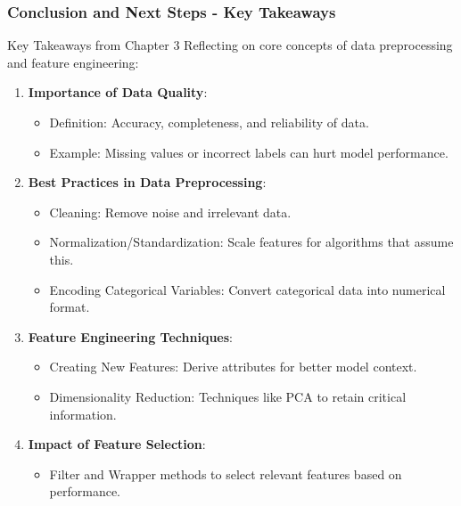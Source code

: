 \documentclass[aspectratio=169]{beamer}
\begin{document}
\begin{frame}[fragile]
  \frametitle{Conclusion and Next Steps - Key Takeaways}
  
  \begin{block}{Key Takeaways from Chapter 3}
    Reflecting on core concepts of data preprocessing and feature engineering:
  \end{block}
  
  \begin{enumerate}
    \item \textbf{Importance of Data Quality}:
    \begin{itemize}
      \item Definition: Accuracy, completeness, and reliability of data.
      \item Example: Missing values or incorrect labels can hurt model performance.
    \end{itemize}
    
    \item \textbf{Best Practices in Data Preprocessing}:
    \begin{itemize}
      \item Cleaning: Remove noise and irrelevant data.
      \item Normalization/Standardization: Scale features for algorithms that assume this.
      \item Encoding Categorical Variables: Convert categorical data into numerical format.
    \end{itemize}
    
    \item \textbf{Feature Engineering Techniques}:
    \begin{itemize}
      \item Creating New Features: Derive attributes for better model context.
      \item Dimensionality Reduction: Techniques like PCA to retain critical information.
    \end{itemize}
    
    \item \textbf{Impact of Feature Selection}:
    \begin{itemize}
      \item Filter and Wrapper methods to select relevant features based on performance.
    \end{itemize}
  \end{enumerate}
\end{frame}
\end{document}
